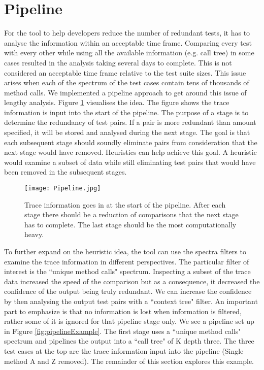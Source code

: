 \section{Pipeline }
\label{pipelinesection}
For the tool to help developers reduce the number of redundant tests, it has to analyse the information within an acceptable time frame. Comparing every test with every other while using all the available information (e.g. call tree) in some cases resulted in the analysis taking several days to complete. This is not considered an acceptable time frame relative to the test suite sizes. This issue arises when each of the spectrum of the test cases contain tens of thousands of method calls. We implemented a pipeline approach to get around this issue of lengthy analysis. Figure \ref{fig:pipeline} visualises the idea. The figure shows the trace information is input into the start of the pipeline. The purpose of a stage is to determine the redundancy of test pairs. If a pair is more redundant than amount specified, it will be stored and analysed during the next stage. The goal is that each subsequent stage should soundly eliminate pairs from consideration that the next stage would have removed. Heuristics can help achieve this goal. A heuristic would examine a subset of data while still eliminating test pairs that would have been removed in the subsequent stages. 

\begin{figure}[h]
\texttt{[image: Pipeline.jpg]}
\caption[A visualization of a pipeline]{Trace information goes in at the start of the pipeline. After each stage there should be a reduction of comparisons that the next stage has to complete. The last stage should be the most computationally heavy.}
\label{fig:pipeline}
\end{figure}

To further expand on the heuristic idea, the tool can use the spectra filters to examine the trace information in different perspectives. The particular filter of interest is the ``unique method calls" spectrum. Inspecting a subset of the trace data increased the speed of the comparison but as a consequence, it decreased the confidence of the output being truly redundant. We can increase the confidence by then analysing the output test pairs with a ``context tree" filter. An important part to emphasize is that no information is lost when information is filtered, rather some of it is ignored for that pipeline stage only. We see a pipeline set up in Figure \ref{fig:pipelineExample}. The first stage uses a ``unique method calls" spectrum and pipelines the output into a ``call tree" of K depth three. The three test cases at the top are the trace information input into the pipeline (Single method A and Z removed). The remainder of this section explores this example. 

